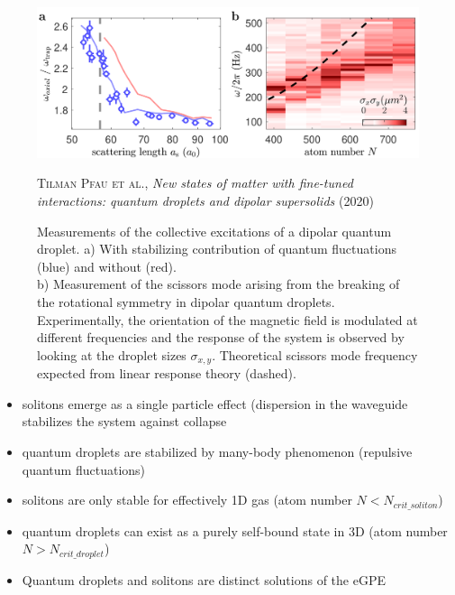 \begin{figure}[H]
    \centering
    \includegraphics[width=1.0\textwidth]{IMAGE/collective_excitation.png}\\
    \caption{
      Measurements of the collective excitations of a dipolar quantum droplet.
      a) With stabilizing contribution of quantum fluctuations (blue) and without (red). \\
      b) Measurement of the scissors mode arising from the breaking of the
         rotational symmetry in dipolar quantum droplets. Experimentally, the orientation of
         the magnetic field is modulated at different frequencies and the response of the system
         is observed by looking at the droplet sizes $\sigma_{x,y}$.
         Theoretical scissors mode frequency expected from linear response theory (dashed).
}
    \textsc{Tilman Pfau et al.}, \emph{New states of matter with fine-tuned interactions:
        quantum droplets and dipolar supersolids} (2020)
    \label{fig:collective}
\end{figure}


\begin{itemize}
    \item solitons emerge as a single particle effect
        (dispersion in the waveguide stabilizes the system against collapse
    \item quantum droplets are stabilized by many-body phenomenon (repulsive quantum fluctuations)
    \item solitons are only stable for effectively 1D gas (atom number $N < N_{crit\_soliton}$)
    \item quantum droplets can exist as a purely self-bound state in 3D (atom number $N > N_{crit\_droplet}$)
    \item Quantum droplets and solitons are distinct solutions of the eGPE
\end{itemize}

